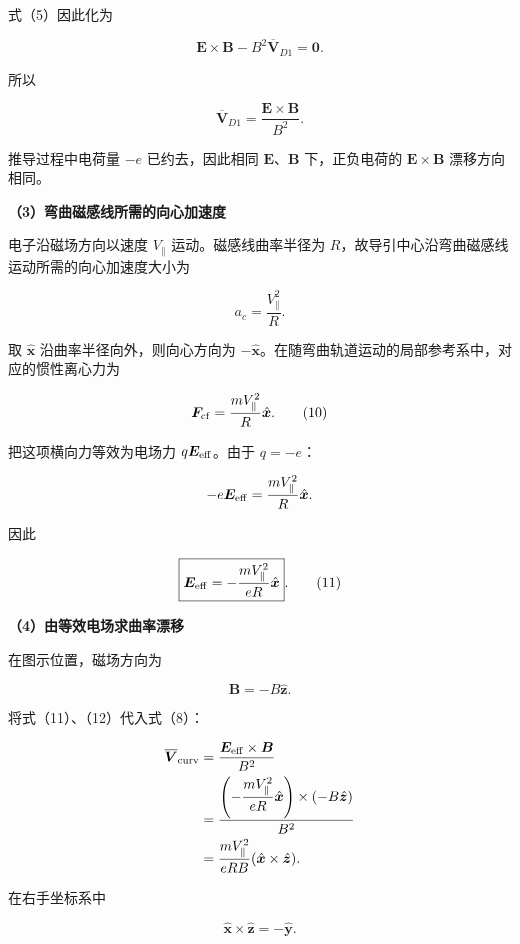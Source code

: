 \documentclass[12pt,a4paper,UTF8]{ctexart}
\begin{document}
式（5）因此化为

\[
\boldsymbol E\times\boldsymbol B
-B^2\overline{\boldsymbol V}_{D1}=\boldsymbol 0.
\]

所以

\[
\boxed{
\overline{\boldsymbol V}_{D1}
=\frac{\boldsymbol E\times\boldsymbol B}{B^2}
}.
\tag{8}
\]

推导过程中电荷量 \(-e\) 已约去，因此相同
\(\boldsymbol E\)、\(\boldsymbol B\) 下，正负电荷的
\(\boldsymbol E\times\boldsymbol B\) 漂移方向相同。

\textbf{（3）弯曲磁感线所需的向心加速度}

电子沿磁场方向以速度 \(V_{\parallel}\) 运动。磁感线曲率半径为
\(R\)，故导引中心沿弯曲磁感线运动所需的向心加速度大小为

\[
a_c=\frac{V_{\parallel}^2}{R}.
\tag{9}
\]

取 \(\hat{\boldsymbol x}\) 沿曲率半径向外，则向心方向为
\(-\hat{\boldsymbol x}\)。在随弯曲轨道运动的局部参考系中，对应的惯性离心力为

\[
\boldsymbol F_{\rm cf}
=\frac{mV_{\parallel}^2}{R}
\hat{\boldsymbol x}.
\tag{10}
\]

把这项横向力等效为电场力 \(q\boldsymbol E_{\rm eff}\)。由于 \(q=-e\)：

\[
-e\boldsymbol E_{\rm eff}
=\frac{mV_{\parallel}^2}{R}
\hat{\boldsymbol x}.
\]

因此

\[
\boxed{
\boldsymbol E_{\rm eff}
=-\frac{mV_{\parallel}^2}{eR}
\hat{\boldsymbol x}
}.
\tag{11}
\]

\textbf{（4）由等效电场求曲率漂移}

在图示位置，磁场方向为

\[
\boldsymbol B=-B\hat{\boldsymbol z}.
\tag{12}
\]

将式（11）、（12）代入式（8）：

\[
\begin{aligned}
\overline{\boldsymbol V}_{\rm curv}
&=\frac{\boldsymbol E_{\rm eff}\times\boldsymbol B}{B^2}\\
&=\frac{
\left(-\dfrac{mV_{\parallel}^2}{eR}\hat{\boldsymbol x}\right)
\times\left(-B\hat{\boldsymbol z}\right)
}{B^2}\\
&=\frac{mV_{\parallel}^2}{eRB}
(\hat{\boldsymbol x}\times\hat{\boldsymbol z}).
\end{aligned}
\]

在右手坐标系中

\[
\hat{\boldsymbol x}\times\hat{\boldsymbol z}
=-\hat{\boldsymbol y}.
\tag{13}
\]
\end{document}
